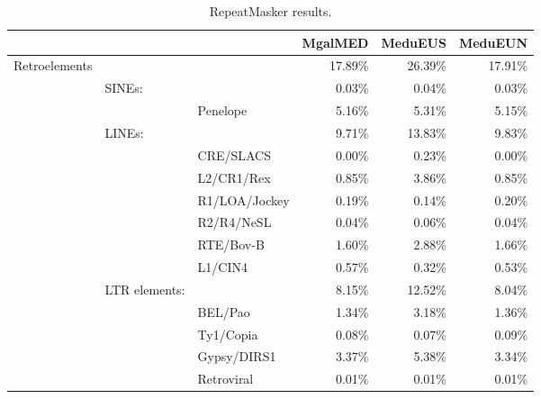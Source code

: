 \begin{table}
	\caption{RepeatMasker results.}
	\label{suptab:repeats}
	\begin{tabular}{p{3cm}p{2.4cm}p{2.8cm}rrr}
		                            &               &                                    & MgalMED & MeduEUS & MeduEUN \\ \toprule
		Retroelements               &               &                                    & 17.89\% & 26.39\% & 17.91\% \\
		                            & SINEs:        &                                    &  0.03\% &  0.04\% &  0.03\% \\
		                            &               & Penelope                           &  5.16\% &  5.31\% &  5.15\% \\
		                            & LINEs:        &                                    &  9.71\% & 13.83\% &  9.83\% \\
		                            &               & CRE/SLACS                          &  0.00\% &  0.23\% &  0.00\% \\
		                            &               & L2/CR1/Rex                         &  0.85\% &  3.86\% &  0.85\% \\
		                            &               & R1/LOA/Jockey                      &  0.19\% &  0.14\% &  0.20\% \\
		                            &               & R2/R4/NeSL                         &  0.04\% &  0.06\% &  0.04\% \\
		                            &               & RTE/Bov-B                          &  1.60\% &  2.88\% &  1.66\% \\
		                            &               & L1/CIN4                            &  0.57\% &  0.32\% &  0.53\% \\
		                            & LTR elements: &                                    &  8.15\% & 12.52\% &  8.04\% \\
		                            &               & BEL/Pao                            &  1.34\% &  3.18\% &  1.36\% \\
		                            &               & Ty1/Copia                          &  0.08\% &  0.07\% &  0.09\% \\
		                            &               & Gypsy/DIRS1                        &  3.37\% &  5.38\% &  3.34\% \\
		                            &               & Retroviral                         &  0.01\% &  0.01\% &  0.01\% \\[3mm]

\end{tabular}
\end{table}
